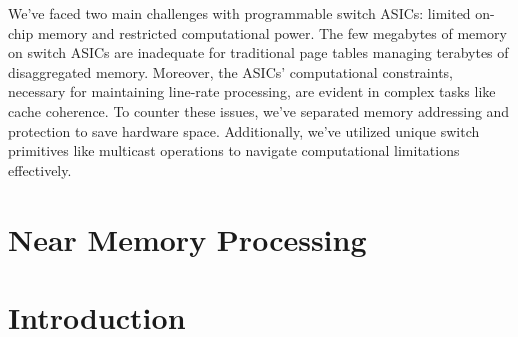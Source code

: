 We've faced two main challenges with programmable switch ASICs: limited on-chip memory and restricted computational power. The few megabytes of memory on switch ASICs are inadequate for traditional page tables managing terabytes of disaggregated memory. Moreover, the ASICs' computational constraints, necessary for maintaining line-rate processing, are evident in complex tasks like cache coherence. To counter these issues, we've separated memory addressing and protection to save hardware space. Additionally, we've utilized unique switch primitives like multicast operations to navigate computational limitations effectively.





\section{Near Memory Processing}

\section{Introduction}
\label{sec:intro}



